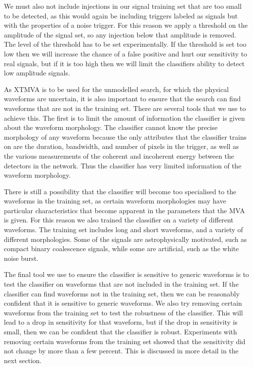\documentclass[11pt]{cuthesis}
\begin{document}
We must also not include injections in our signal training set that are too small to be detected, as this would again be including triggers labeled as signals but with the properties of a noise trigger. For this reason we apply a threshold on the amplitude of the signal set, so any injection below that amplitude is removed. The level of the threshold has to be set experimentally. If the threshold is set too low then we will increase the chance of a false positive and hurt our sensitivity to real signals, but if it is too high then we will limit the classifiers ability to detect low amplitude signals. 

As XTMVA is to be used for the unmodelled search, for which the physical waveforms are uncertain, it is also important to ensure that the search can find waveforms that are not in the training set. There are several tools that we use to achieve this. The first is to limit the amount of information the classifier is given about the waveform morphology. The classifier cannot know the precise morphology of any waveform because the only attributes that the classifier trains on are the duration, bandwidth, and number of pixels in the trigger, as well as the various measurements of the coherent and incoherent energy between the detectors in the network. Thus the classifier has very limited information of the waveform morphology.

There is still a possibility that the classifier will become too specialised to the waveforms in the training set, as certain waveform morphologies may have particular characteristics that become apparent in the parameters that the MVA is given. For this reason we also trained the classifier on a variety of different waveforms. The training set includes long and short waveforms, and a variety of different morphologies. Some of the signals are astrophysically motivated, such as compact binary coalescence signals, while some are artificial, such as the white noise burst. 

The final tool we use to ensure the classifier is sensitive to generic waveforms is to test the classifier on waveforms that are not included in the training set. If the classifier can find waveforms not in the training set, then we can be reasonably confident that it is sensitive to generic waveforms. We also try removing certain waveforms from the training set to test the robustness of the classifier. This will lead to a drop in sensitivity for that waveform, but if the drop in sensitivity is small, then we can be confident that the classifier is robust. Experiments with removing certain waveforms from the training set showed that the sensitivity did not change by more than a few percent. This is discussed in more detail in the next section.
\end{document}
